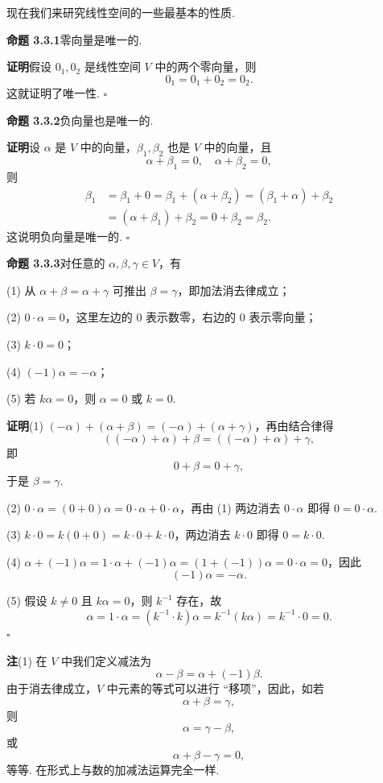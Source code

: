 \documentclass[UTF8, 12pt, fontset=fandol, oneside]{ctexart}
\begin{document}
现在我们来研究线性空间的一些最基本的性质.

\noindent\textbf{命题 3.3.1}\quad 零向量是唯一的.

\noindent\textbf{证明}\quad 假设 $0_1,0_2$ 是线性空间 $V$ 中的两个零向量，则
\[
0_1=0_1+0_2=0_2.
\]
这就证明了唯一性. $\square$

\noindent\textbf{命题 3.3.2}\quad 负向量也是唯一的.

\noindent\textbf{证明}\quad 设 $\alpha$ 是 $V$ 中的向量，$\beta_1,\beta_2$ 也是 $V$ 中的向量，且
\[
\alpha+\beta_1=0,\quad \alpha+\beta_2=0,
\]
则
\[
\begin{aligned}
\beta_1
&=\beta_1+0=\beta_1+(\alpha+\beta_2)=(\beta_1+\alpha)+\beta_2\\
&=(\alpha+\beta_1)+\beta_2=0+\beta_2=\beta_2.
\end{aligned}
\]
这说明负向量是唯一的. $\square$

\noindent\textbf{命题 3.3.3}\quad 对任意的 $\alpha,\beta,\gamma\in V$，有

(1) 从 $\alpha+\beta=\alpha+\gamma$ 可推出 $\beta=\gamma$，即加法消去律成立；

(2) $0\cdot\alpha=0$，这里左边的 $0$ 表示数零，右边的 $0$ 表示零向量；

(3) $k\cdot 0=0$；

(4) $(-1)\alpha=-\alpha$；

(5) 若 $k\alpha=0$，则 $\alpha=0$ 或 $k=0$.

\noindent\textbf{证明}\quad (1) $(-\alpha)+(\alpha+\beta)=(-\alpha)+(\alpha+\gamma)$，再由结合律得
\[
((-\alpha)+\alpha)+\beta= ((-\alpha)+\alpha)+\gamma,
\]
即
\[
0+\beta=0+\gamma,
\]
于是 $\beta=\gamma$.

(2) $0\cdot\alpha=(0+0)\alpha=0\cdot\alpha+0\cdot\alpha$，再由 (1) 两边消去 $0\cdot\alpha$ 即得 $0=0\cdot\alpha$.

(3) $k\cdot 0=k(0+0)=k\cdot 0+k\cdot 0$，两边消去 $k\cdot 0$ 即得 $0=k\cdot 0$.

(4) $\alpha+(-1)\alpha=1\cdot\alpha+(-1)\alpha=(1+(-1))\alpha=0\cdot\alpha=0$，因此
\[
(-1)\alpha=-\alpha.
\]

(5) 假设 $k\neq 0$ 且 $k\alpha=0$，则 $k^{-1}$ 存在，故
\[
\alpha=1\cdot\alpha=(k^{-1}\cdot k)\alpha=k^{-1}(k\alpha)=k^{-1}\cdot 0=0.
\]
$\square$

\noindent\textbf{注}\quad (1) 在 $V$ 中我们定义减法为
\[
\alpha-\beta=\alpha+(-1)\beta.
\]
由于消去律成立，$V$ 中元素的等式可以进行 ``移项''，因此，如若
\[
\alpha+\beta=\gamma,
\]
则
\[
\alpha=\gamma-\beta,
\]
或
\[
\alpha+\beta-\gamma=0,
\]
等等. 在形式上与数的加减法运算完全一样.
\end{document}

